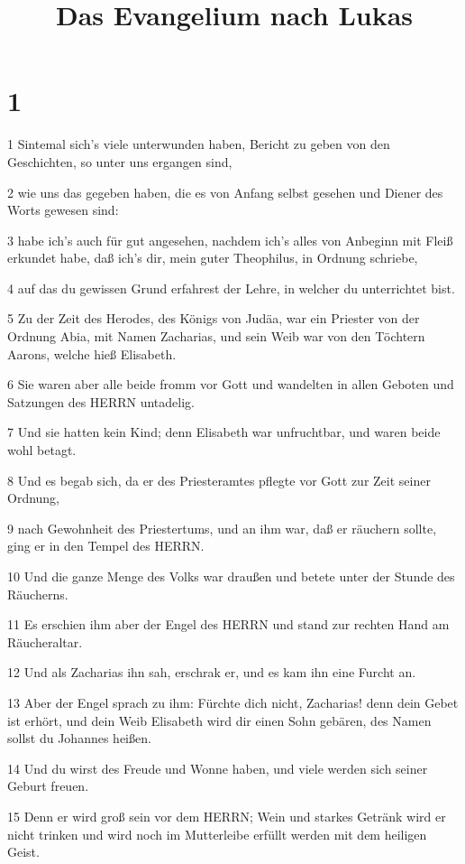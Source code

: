 

\title{Das Evangelium nach Lukas}


\chapter{1}

\par 1 Sintemal sich's viele unterwunden haben, Bericht zu geben von den Geschichten, so unter uns ergangen sind,
\par 2 wie uns das gegeben haben, die es von Anfang selbst gesehen und Diener des Worts gewesen sind:
\par 3 habe ich's auch für gut angesehen, nachdem ich's alles von Anbeginn mit Fleiß erkundet habe, daß ich's dir, mein guter Theophilus, in Ordnung schriebe,
\par 4 auf das du gewissen Grund erfahrest der Lehre, in welcher du unterrichtet bist.
\par 5 Zu der Zeit des Herodes, des Königs von Judäa, war ein Priester von der Ordnung Abia, mit Namen Zacharias, und sein Weib war von den Töchtern Aarons, welche hieß Elisabeth.
\par 6 Sie waren aber alle beide fromm vor Gott und wandelten in allen Geboten und Satzungen des HERRN untadelig.
\par 7 Und sie hatten kein Kind; denn Elisabeth war unfruchtbar, und waren beide wohl betagt.
\par 8 Und es begab sich, da er des Priesteramtes pflegte vor Gott zur Zeit seiner Ordnung,
\par 9 nach Gewohnheit des Priestertums, und an ihm war, daß er räuchern sollte, ging er in den Tempel des HERRN.
\par 10 Und die ganze Menge des Volks war draußen und betete unter der Stunde des Räucherns.
\par 11 Es erschien ihm aber der Engel des HERRN und stand zur rechten Hand am Räucheraltar.
\par 12 Und als Zacharias ihn sah, erschrak er, und es kam ihn eine Furcht an.
\par 13 Aber der Engel sprach zu ihm: Fürchte dich nicht, Zacharias! denn dein Gebet ist erhört, und dein Weib Elisabeth wird dir einen Sohn gebären, des Namen sollst du Johannes heißen.
\par 14 Und du wirst des Freude und Wonne haben, und viele werden sich seiner Geburt freuen.
\par 15 Denn er wird groß sein vor dem HERRN; Wein und starkes Getränk wird er nicht trinken und wird noch im Mutterleibe erfüllt werden mit dem heiligen Geist.
